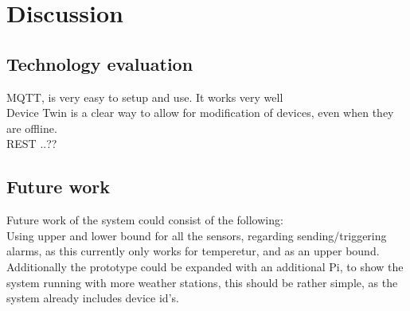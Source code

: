 \section{Discussion} \label{sec:discussion}

\subsection{Technology evaluation}
MQTT, is very easy to setup and use. It works very well\\
Device Twin is a clear way to allow for modification of devices, even when they are offline.\\
REST ..??

\subsection{Future work}
Future work of the system could consist of the following:\\
Using upper and lower bound for all the sensors, regarding sending/triggering alarms, as this currently only works for temperetur, and as an upper bound.\\
Additionally the prototype could be expanded with an additional Pi, to show the system running with more weather stations, this should be rather simple, as the system already includes device id's.







